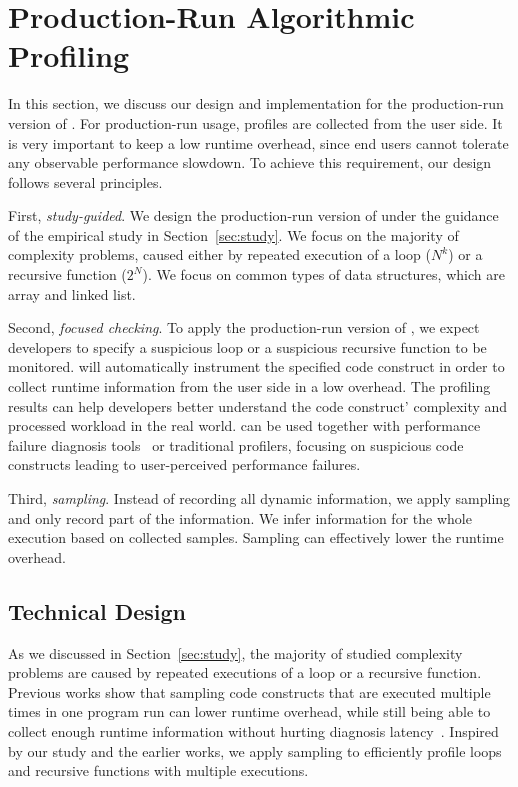 \newpage
\section{Production-Run Algorithmic Profiling}
\label{sec:online}

In this section, we discuss our design and 
implementation for the production-run version of \Tool. 
For production-run usage, profiles are collected from the user side.
It is very important to keep a low runtime overhead, since
end users cannot tolerate any observable performance slowdown.
To achieve this requirement,
our design follows several principles. 

First, \textit{study-guided}. 
We design the production-run version of \Tool
under the guidance of the empirical study in Section~\ref{sec:study}.
We focus on the majority of complexity problems, 
caused either by repeated execution of a loop ($N^k$)
or a recursive function ($2^N$).
We focus on common types of data structures, which are array and linked list.

Second, \textit{focused checking}.
To apply the production-run version of \Tool, 
we expect developers to specify a suspicious loop or a suspicious recursive function
to be monitored. 
\Tool will automatically instrument the specified code construct 
in order to collect runtime information from the user side in a low overhead. 
The profiling results can help developers better understand the code construct' 
complexity and processed workload in the real world.
\Tool can be used together with performance failure 
diagnosis tools~\cite{SongOOPSLA2014} 
or traditional profilers,
focusing on suspicious code constructs leading 
to user-perceived performance failures.

Third, \textit{sampling}.
Instead of recording all dynamic information, 
we apply sampling and only record part of the information. 
We infer information for the whole execution based on collected samples. 
Sampling can effectively lower the runtime overhead. 


\subsection{Technical Design}
As we discussed in Section~\ref{sec:study}, 
the majority of studied complexity problems are caused 
by repeated executions of a loop or a recursive function. 
Previous works show that sampling code constructs that are executed 
multiple times in one program run can lower runtime overhead, 
while still being able to collect enough runtime information 
without hurting diagnosis latency~\cite{SongOOPSLA2014,ldoctor}. 
Inspired by our study and the earlier works, 
we apply sampling to efficiently profile loops 
and recursive functions with multiple executions. 

